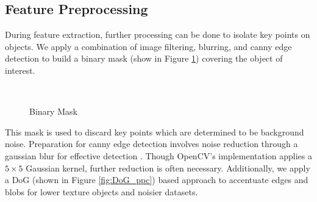 \documentclass[conference,compsoc]{IEEEtran}
\begin{document}
\subsection{Feature Preprocessing}
During feature extraction, further processing can be 
done to isolate key points on objects. We apply a combination of 
image filtering, blurring, and canny edge detection to build a binary mask
(show in Figure \ref{fig:mask}) covering the object of interest. 
\begin{figure}[ht!]
    \centering
    \
    \caption{Binary Mask}
    \label{fig:mask}
\end{figure}
This mask is used to discard key points which are determined to be background noise.
Preparation for canny edge detection involves noise reduction through a gaussian blur
for effective detection \cite{ced}. Though OpenCV's implementation \cite{ced_ocv}
applies a $5\times 5$ Gaussian kernel, further reduction is often necessary.
Additionally, we apply a DoG (shown in Figure \ref{fig:DoG_ppc}) based approach to accentuate edges and blobs 
for lower texture objects and noisier datasets. 
\end{document}
